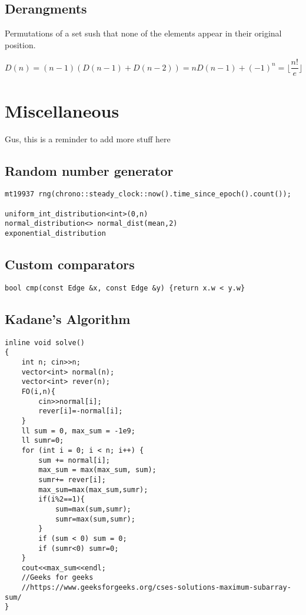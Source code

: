 \documentclass[10pt]{article}
\begin{document}
\begin{multicols*}{2}
\subsection{Derangments}

Permutations of a set sush that none of the elements appear in their original position.

\[
D(n) = (n-1)(D(n-1)+D(n-2)) = nD(n-1)+(-1)^n = \lfloor \frac{n!}{e}\rfloor
\]

\section{Miscellaneous}

Gus, this is a reminder to add more stuff here

\subsection{Random number generator}

\begin{lstlisting}[style=compactcpp]
mt19937 rng(chrono::steady_clock::now().time_since_epoch().count());

uniform_int_distribution<int>(0,n)
normal_distribution<> normal_dist(mean,2)
exponential_distribution
\end{lstlisting}

\subsection{Custom comparators}

\begin{lstlisting}[style=compactcpp]
bool cmp(const Edge &x, const Edge &y) {return x.w < y.w}
\end{lstlisting}

\subsection{Kadane's Algorithm}
\begin{lstlisting}[style=compactcpp]
inline void solve()
{
    int n; cin>>n;
    vector<int> normal(n);
    vector<int> rever(n);
    FO(i,n){
        cin>>normal[i];
        rever[i]=-normal[i];
    }
    ll sum = 0, max_sum = -1e9;
    ll sumr=0;
    for (int i = 0; i < n; i++) {
        sum += normal[i];
        max_sum = max(max_sum, sum);
        sumr+= rever[i];
        max_sum=max(max_sum,sumr);
        if(i%2==1){
            sum=max(sum,sumr);
            sumr=max(sum,sumr);
        }
        if (sum < 0) sum = 0;
        if (sumr<0) sumr=0;
    }
    cout<<max_sum<<endl;
    //Geeks for geeks
    //https://www.geeksforgeeks.org/cses-solutions-maximum-subarray-sum/
}
\end{lstlisting}


\end{multicols*}
\end{document}
